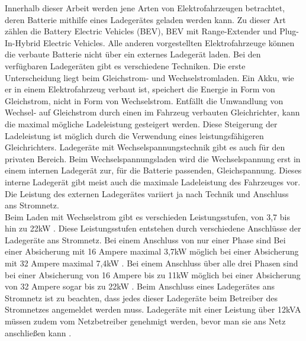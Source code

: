 Innerhalb dieser Arbeit werden jene Arten von Elektrofahrzeugen betrachtet, deren Batterie mithilfe eines Ladegerätes geladen werden kann. Zu dieser Art zählen die Battery Electric Vehicles (BEV), BEV mit Range-Extender und Plug-In-Hybrid Electric Vehicles. Alle anderen vorgestellten Elektrofahrzeuge können die verbaute Batterie nicht über ein externes Ladegerät laden. Bei den verfügbaren Ladegeräten gibt es verschiedene Techniken. Die erste Unterscheidung liegt beim Gleichstrom- und Wechselstromladen. Ein Akku, wie er in einem Elektrofahrzeug verbaut ist, speichert die Energie in Form von Gleichstrom, nicht in Form von Wechselstrom. Entfällt die Umwandlung von Wechsel- auf Gleichstrom durch einen im Fahrzeug verbauten Gleichrichter, kann die maximal mögliche Ladeleistung gesteigert werden. Diese Steigerung der Ladeleistung ist möglich durch die Verwendung eines leistungsfähigeren Gleichrichters. Ladegeräte mit Wechselspannungstechnik gibt es auch für den privaten Bereich. Beim Wechselspannungsladen wird die Wechselspannung erst in einem internen Ladegerät zur, für die Batterie passenden, Gleichspannung. Dieses interne Ladegerät gibt meist auch die maximale Ladeleistung des Fahrzeuges vor. Die Leistung des externen Ladegerätes variiert ja nach Technik und Anschluss ans Stromnetz. \\
Beim Laden mit Wechselstrom gibt es verschieden Leistungsstufen, von 3,7 bis hin zu 22kW \cite{laden_1}. Diese Leistungsstufen entstehen durch verschiedene Anschlüsse der Ladegeräte ans Stromnetz. Bei einem Anschluss von nur einer Phase sind Bei einer Absicherung mit 16 Ampere maximal 3,7kW möglich bei einer Absicherung mit 32 Ampere maximal 7,4kW \cite{laden_1}. Bei einem Anschluss über alle drei Phasen sind bei einer Absicherung von 16 Ampere bis zu 11kW möglich bei einer Absicherung von 32 Ampere sogar bis zu 22kW \cite{laden_1}. Beim Anschluss eines Ladegerätes ans Stromnetz ist zu beachten, dass jedes dieser Ladegeräte beim Betreiber des Stromnetzes angemeldet werden muss. Ladegeräte mit einer Leistung über 12kVA müssen zudem vom Netzbetreiber genehmigt werden, bevor man sie ans Netz anschließen kann \cite{Lader_anschluss}.




